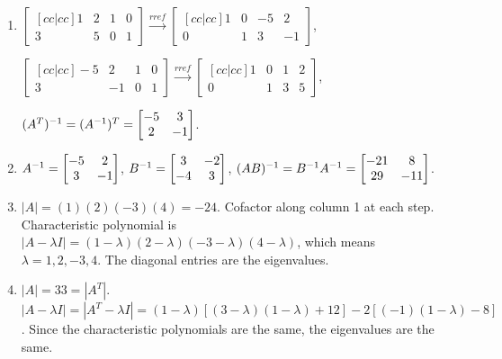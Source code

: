 {\begin{multicols}{2}
\begin{enumerate}
\begin{enumerate}
	Coord. of $(1,2,0,4)$ are $(1,2)$.
	Coord. of $(2,3,-1,0)$ are $(2,3)$.
	Coord. of $(3,5,-1,4)$ are $(3,5)$.
	(These coordinates come from the rows of the pivot columns.)

  \item  
  $
  \begin{bmatrix}[cc|cc]
	1 & 2 & 1 & 0 \\
	3 & 5 & 0 & 1
	\end{bmatrix}
	\xrightarrow{rref}
  \begin{bmatrix}[cc|cc]
	1 & 0 & -5 & 2 \\
	0 & 1 & 3 & -1
	\end{bmatrix}
	$,
	
  $
  \begin{bmatrix}[cc|cc]
	-5 & 2 & 1 & 0 \\
	3 & -1 & 0 & 1
	\end{bmatrix}
	\xrightarrow{rref}
  \begin{bmatrix}[cc|cc]
	1 & 0 & 1 & 2 \\
	0 & 1 & 3 & 5
	\end{bmatrix}
	$,
	  
	$(A^T)^{-1} = (A^{-1})^T = 
  \begin{bmatrix}
	 -5 & 3 \\
	 2 & -1
	\end{bmatrix}
	$.


  \item 
  $A^{-1} = \begin{bmatrix}
	-5 & 2 \\
	3 & -1
	\end{bmatrix}$, 
	$B^{-1}=\begin{bmatrix}
	3 & -2 \\
	-4 & 3
	\end{bmatrix}$, 
	$(AB)^{-1} = B^{-1} A^{-1}=\begin{bmatrix}
	-21 & 8 \\
	29 & -11
	\end{bmatrix}$. 


  \item  
$|A| = (1)(2)(-3)(4) = -24$. Cofactor along column 1 at each step. Characteristic polynomial is 
$|A-\lambda I| = (1-\lambda)(2-\lambda)(-3-\lambda)(4-\lambda)$, which means $\lambda = 1,2,-3,4$. The diagonal entries are the eigenvalues.
  
  \item $|A| = 33 = |A^T|$. 
  $|A-\lambda I|=|A^T-\lambda I| = (1-\lambda)[(3-\lambda)(1-\lambda)+12]-2[(-1)(1-\lambda)-8]$. Since the characteristic polynomials are the same, the eigenvalues are the same. 
  

\end{enumerate}
\end{enumerate}
\end{multicols}}
